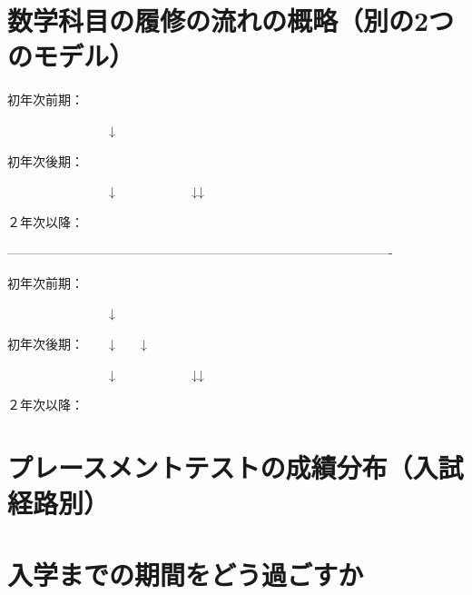 \documentclass[a4j,landscape,25pt]{jsarticle}
\begin{document}
\section{数学科目の履修の流れの概略（別の2つのモデル）}

初年次前期：

　　　　　　　　↓

初年次後期：\hspace{17pt}　\quad{}

　　　　　　　　↓　　　　　　\hspace{3.5pt}↓\hspace{104pt}↓

２年次以降：\quad{}\quad{}\quad{}\quad{}\hspace{31pt}

-------------------------------------------------------------------------------------------

初年次前期：

　　　　　　　　↓\hspace{43pt}

初年次後期：　　↓\hspace{30.5pt}\quad　　↓　　　\quad{}

　　　　　　　　↓　　　　　　\hspace{3.5pt}↓\hspace{104pt}↓

２年次以降：\quad{}\quad{}\quad{}\quad{}\hspace{31pt}




\section{プレースメントテストの成績分布（入試経路別）}

\section{入学までの期間をどう過ごすか}
\end{document}
